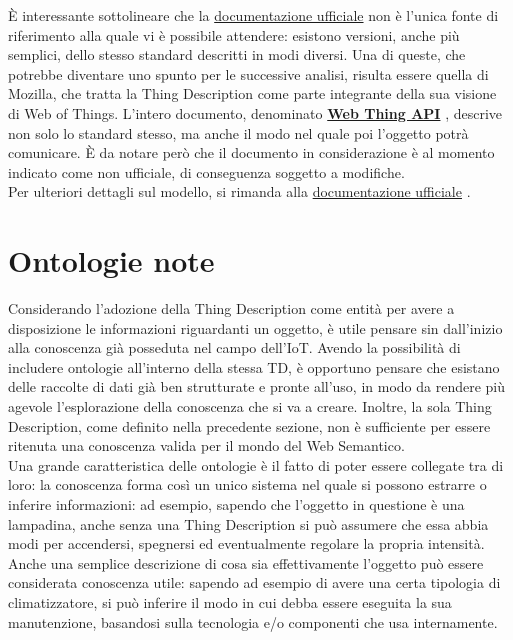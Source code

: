 \documentclass[12pt,a4paper,openright,oneside]{report}
\begin{document}
È interessante sottolineare che la \underline{documentazione ufficiale} \cite{td} non è l'unica fonte di riferimento alla quale vi è possibile attendere: esistono versioni, anche più semplici, dello stesso standard descritti in modi diversi. Una di queste, che potrebbe diventare uno spunto per le successive analisi, risulta essere quella di Mozilla, che tratta la Thing Description come parte integrante della sua visione di Web of Things. L'intero documento, denominato \href{https://webthings.io/api/}{\textbf{Web Thing API}} \cite{web_thing_api}, descrive non solo lo standard stesso, ma anche il modo nel quale poi l'oggetto potrà comunicare. È da notare però che il documento in considerazione è al momento indicato come non ufficiale, di conseguenza soggetto a modifiche.\\

Per ulteriori dettagli sul modello, si rimanda alla \underline{documentazione ufficiale} \cite{td}.


\section{Ontologie note}
Considerando l'adozione della Thing Description come entità per avere a disposizione le informazioni riguardanti un oggetto, è utile pensare sin dall'inizio alla conoscenza già posseduta nel campo dell'IoT. Avendo la possibilità di includere ontologie all'interno della stessa TD, è opportuno pensare che esistano delle raccolte di dati già ben strutturate e pronte all'uso, in modo da rendere più agevole l'esplorazione della conoscenza che si va a creare. Inoltre, la sola Thing Description, come definito nella precedente sezione, non è sufficiente per essere ritenuta una conoscenza valida per il mondo del Web Semantico.\\

Una grande caratteristica delle ontologie è il fatto di poter essere collegate tra di loro: la conoscenza forma così un unico sistema nel quale si possono estrarre o inferire informazioni: ad esempio, sapendo che l'oggetto in questione è una lampadina, anche senza una Thing Description si può assumere che essa abbia modi per accendersi, spegnersi ed eventualmente regolare la propria intensità. Anche una semplice descrizione di cosa sia effettivamente l'oggetto può essere considerata conoscenza utile: sapendo ad esempio di avere una certa tipologia di climatizzatore, si può inferire il modo in cui debba essere eseguita la sua manutenzione, basandosi sulla tecnologia e/o componenti che usa internamente.\\
\end{document}
